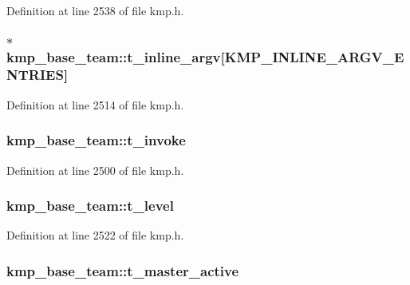 Definition at line 2538 of file kmp.\-h.

\hypertarget{structkmp__base__team_a43f00716c5f187830f607bbb53db6510}{
\subsubsection[{t\-\_\-inline\-\_\-argv}]{$\ast$ kmp\-\_\-base\-\_\-team\-::t\-\_\-inline\-\_\-argv\mbox{[}{\bf K\-M\-P\-\_\-\-I\-N\-L\-I\-N\-E\-\_\-\-A\-R\-G\-V\-\_\-\-E\-N\-T\-R\-I\-E\-S}\mbox{]}}}\label{structkmp__base__team_a43f00716c5f187830f607bbb53db6510}


Definition at line 2514 of file kmp.\-h.

\hypertarget{structkmp__base__team_a1adf2c475f7b5486c1dff23a4f48c2e2}{
\subsubsection[{t\-\_\-invoke}]{ kmp\-\_\-base\-\_\-team\-::t\-\_\-invoke}}\label{structkmp__base__team_a1adf2c475f7b5486c1dff23a4f48c2e2}


Definition at line 2500 of file kmp.\-h.

\hypertarget{structkmp__base__team_a3b11852bae6559f07f079dec0ad17585}{
\subsubsection[{t\-\_\-level}]{ kmp\-\_\-base\-\_\-team\-::t\-\_\-level}}\label{structkmp__base__team_a3b11852bae6559f07f079dec0ad17585}


Definition at line 2522 of file kmp.\-h.

\hypertarget{structkmp__base__team_a18340fbe86c61e660834d20385e6d40c}{
\subsubsection[{t\-\_\-master\-\_\-active}]{ kmp\-\_\-base\-\_\-team\-::t\-\_\-master\-\_\-active}}\label{structkmp__base__team_a18340fbe86c61e660834d20385e6d40c}


